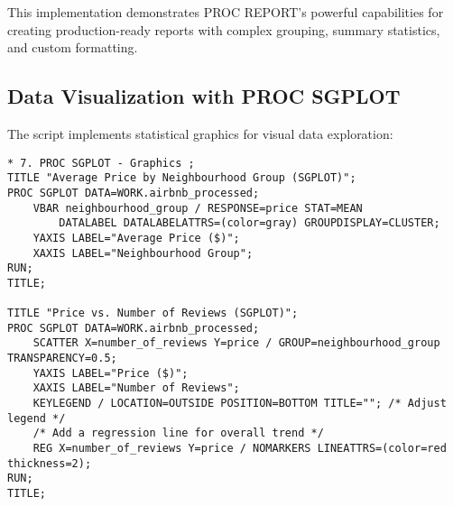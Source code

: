 \documentclass{article}
\begin{document}
This implementation demonstrates PROC REPORT's powerful capabilities for creating production-ready reports with complex grouping, summary statistics, and custom formatting.

\subsection{Data Visualization with PROC SGPLOT}
The script implements statistical graphics for visual data exploration:

\begin{lstlisting}[style=SASStyle, caption=Statistical Graphics Implementation]
* 7. PROC SGPLOT - Graphics ;
TITLE "Average Price by Neighbourhood Group (SGPLOT)";
PROC SGPLOT DATA=WORK.airbnb_processed;
    VBAR neighbourhood_group / RESPONSE=price STAT=MEAN
        DATALABEL DATALABELATTRS=(color=gray) GROUPDISPLAY=CLUSTER;
    YAXIS LABEL="Average Price ($)";
    XAXIS LABEL="Neighbourhood Group";
RUN;
TITLE;

TITLE "Price vs. Number of Reviews (SGPLOT)";
PROC SGPLOT DATA=WORK.airbnb_processed;
    SCATTER X=number_of_reviews Y=price / GROUP=neighbourhood_group TRANSPARENCY=0.5;
    YAXIS LABEL="Price ($)";
    XAXIS LABEL="Number of Reviews";
    KEYLEGEND / LOCATION=OUTSIDE POSITION=BOTTOM TITLE=""; /* Adjust legend */
    /* Add a regression line for overall trend */
    REG X=number_of_reviews Y=price / NOMARKERS LINEATTRS=(color=red thickness=2);
RUN;
TITLE;
\end{lstlisting}
\end{document}
